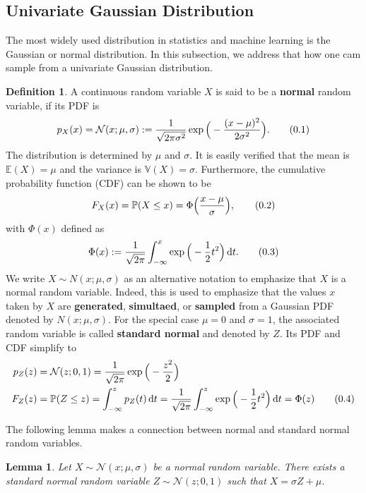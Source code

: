 \documentclass[10pt]{article}
\newtheorem{lem}[thm]{Lemma}
\theoremstyle{definition}
\newtheorem{defn}{Definition}[section]
\theoremstyle{definition}
\theoremstyle{remark}
\newcommand\eqnum{\addtocounter{equation}{1}\tag{\arabic{section}.\arabic{equation}}}
\DeclareMathOperator{\df}{d\!}
\begin{document}
\subsection{Univariate Gaussian Distribution}
The most widely used distribution in statistics and machine learning is the Gaussian or normal distribution. In this subsection, we address that how one cam sample from a univariate Gaussian distribution.
\begin{defn}
A continuous random variable $X$ is said to be a \textbf{normal} random variable, if its PDF is
\begin{equation*}
p_{X}(x) = \mathcal{N}(x; \mu, \sigma) := \frac{1}{\sqrt{2\pi\sigma^2}}\exp\Big(-\frac{(x-\mu)^2}{2\sigma^2}\Big).
\eqnum
\end{equation*}
The distribution is determined by $\mu$ and $\sigma$. It is easily verified that the mean is $\mathbb{E}(X) = \mu$ and the variance is $\mathbb{V}(X)=\sigma$. Furthermore, the cumulative probability function (CDF) can be shown to be
\begin{equation*}
F_{X}(x) = \mathbb{P}(X \leq x) = \Phi\Big(\frac{x-\mu}{\sigma}\Big),
\eqnum
\end{equation*}
with $\Phi(x)$ defined as
\begin{equation*}
\Phi(x) := \frac{1}{\sqrt{2\pi}}\int_{-\infty}^{x}\exp\Big(-\frac{1}{2}t^2\Big)\df t.
\eqnum
\end{equation*}
We write $X\sim N(x; \mu, \sigma)$ as an alternative notation to emphasize that $X$ is a normal random variable. Indeed, this is used to emphasize that the values $x$ taken by $X$ are \textbf{generated}, \textbf{simultaed}, or \textbf{sampled} from a Gaussian PDF denoted by $N(x; \mu, \sigma)$. For the special case $\mu = 0$ and $\sigma = 1$, the associated random variable is called \textbf{standard normal} and denoted by $Z$. Its PDF and CDF simplify to
\begin{align*}
p_{Z}(z) &= \mathcal{N}(z; 0, 1) = \frac{1}{\sqrt{2\pi}}\exp\Big(-\frac{z^2}{2}\Big) \\
F_Z(z) &= \mathbb{P}(Z\leq z) = \int_{-\infty}^{z}p_Z(t)\df t = 
\frac{1}{\sqrt{2\pi}}\int_{-\infty}^{z}\exp\Big(-\frac{1}{2}t^2\Big)\df t = \Phi(z)
\eqnum
\end{align*}
\end{defn}
\noindent
The following lemma makes a connection between normal and standard normal random variables.
\begin{lem}
Let $X\sim\mathcal{N}(x; \mu, \sigma)$ be a normal random variable. There exists a standard normal random variable $Z\sim\mathcal{N}(z; 0, 1)$ such that $X=\sigma Z + \mu$.
\end{lem}
\end{document}
